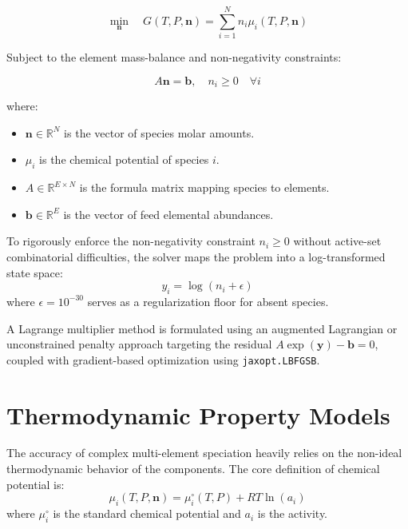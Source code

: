 \documentclass[11pt,a4paper]{article}
\begin{document}
\begin{equation}
    \min_{\mathbf{n}} \quad G(T, P, \mathbf{n}) = \sum_{i=1}^{N} n_i \mu_i(T, P, \mathbf{n})
\end{equation}

Subject to the element mass-balance and non-negativity constraints:

\begin{equation}
    A \mathbf{n} = \mathbf{b}, \quad n_i \ge 0 \quad \forall i
\end{equation}

where:
\begin{itemize}
    \item $\mathbf{n} \in \mathbb{R}^N$ is the vector of species molar amounts.
    \item $\mu_i$ is the chemical potential of species $i$.
    \item $A \in \mathbb{R}^{E \times N}$ is the formula matrix mapping species to elements.
    \item $\mathbf{b} \in \mathbb{R}^E$ is the vector of feed elemental abundances.
\end{itemize}

To rigorously enforce the non-negativity constraint $n_i \ge 0$ without active-set combinatorial difficulties, the solver maps the problem into a log-transformed state space:
\begin{equation}
    y_i = \log(n_i + \epsilon)
\end{equation}
where $\epsilon = 10^{-30}$ serves as a regularization floor for absent species. 

A Lagrange multiplier method is formulated using an augmented Lagrangian or unconstrained penalty approach targeting the residual $A \exp(\mathbf{y}) - \mathbf{b} = 0$, coupled with gradient-based optimization using \texttt{jaxopt.LBFGSB}.

\section{Thermodynamic Property Models}

The accuracy of complex multi-element speciation heavily relies on the non-ideal thermodynamic behavior of the components. The core definition of chemical potential is:
\begin{equation}
    \mu_i(T, P, \mathbf{n}) = \mu_i^\circ(T, P) + R T \ln(a_i)
\end{equation}
where $\mu_i^\circ$ is the standard chemical potential and $a_i$ is the activity.
\end{document}

